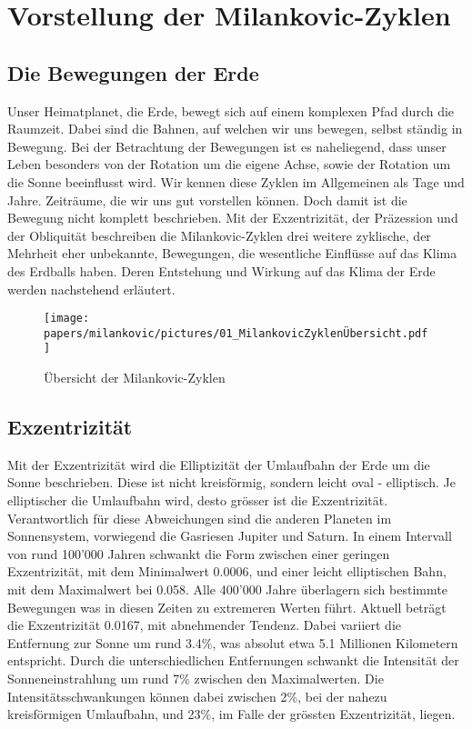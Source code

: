 %
%
%
%
\section{Vorstellung der Milankovic-Zyklen
\label{milankovic:section:VorstellungMIlankovic-Zyklen}}

\subsection{Die Bewegungen der Erde
\label{milankovic:subsection:BewegungenderErde}}
Unser Heimatplanet, die Erde, bewegt sich auf einem komplexen Pfad durch die Raumzeit.
Dabei sind die Bahnen, auf welchen wir uns bewegen, selbst ständig in Bewegung.
Bei der Betrachtung der Bewegungen ist es naheliegend, dass unser Leben besonders von der Rotation um die eigene Achse, sowie der Rotation um die Sonne beeinflusst wird.
Wir kennen diese Zyklen im Allgemeinen als Tage und Jahre.
Zeiträume, die wir uns gut vorstellen können.
Doch damit ist die Bewegung nicht komplett beschrieben.
Mit der Exzentrizität, der Präzession und der Obliquität beschreiben die Milankovic-Zyklen drei weitere zyklische, der Mehrheit eher unbekannte, Bewegungen, die wesentliche Einflüsse auf das Klima des Erdballs haben.
Deren Entstehung und Wirkung auf das Klima der Erde werden nachstehend erläutert.

\begin{figure}
	\centering
	\texttt{[image: papers/milankovic/pictures/01\_MilankovicZyklenÜbersicht.pdf]}
	\caption{Übersicht der Milankovic-Zyklen
		\label{picture Übersicht Milankovic-Zyklen}}
\end{figure}

\subsection{Exzentrizität
\label{milankovic:subsection:Exzentrizität}}
Mit der Exzentrizität wird die Elliptizität der Umlaufbahn der Erde um die Sonne beschrieben.
Diese ist nicht kreisförmig, sondern leicht oval - elliptisch.
Je elliptischer die Umlaufbahn wird, desto grösser ist die Exzentrizität.
Verantwortlich für diese Abweichungen sind die anderen Planeten im Sonnensystem, vorwiegend die Gasriesen Jupiter und Saturn.
In einem Intervall von rund 100'000 Jahren schwankt die Form zwischen einer geringen Exzentrizität, mit dem Minimalwert 0.0006, und einer leicht elliptischen Bahn, mit dem Maximalwert bei 0.058.
Alle 400'000 Jahre überlagern sich bestimmte Bewegungen was in diesen Zeiten zu extremeren Werten führt.
Aktuell beträgt die Exzentrizität 0.0167, mit abnehmender Tendenz.
Dabei variiert die Entfernung zur Sonne um rund 3.4\%, was absolut etwa 5.1 Millionen Kilometern entspricht.
Durch die unterschiedlichen Entfernungen schwankt die Intensität der Sonneneinstrahlung um rund 7\% zwischen den Maximalwerten.
Die Intensitätsschwankungen können dabei zwischen 2\%, bei der nahezu kreisförmigen Umlaufbahn, und 23\%, im Falle der grössten Exzentrizität, liegen.

